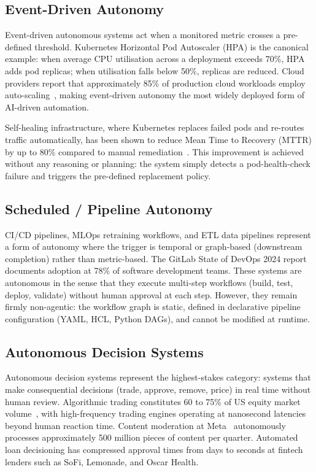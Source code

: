 \documentclass[12pt, a4paper]{article}
\begin{document}
\subsection{Event-Driven Autonomy}
Event-driven autonomous systems act when a monitored metric crosses a pre-defined threshold. Kubernetes Horizontal Pod Autoscaler (HPA) is the canonical example: when average CPU utilisation across a deployment exceeds 70\%, HPA adds pod replicas; when utilisation falls below 50\%, replicas are reduced. Cloud providers report that approximately 85\% of production cloud workloads employ auto-scaling~\citep{aws2024autoscaling}, making event-driven autonomy the most widely deployed form of AI-driven automation.

Self-healing infrastructure, where Kubernetes replaces failed pods and re-routes traffic automatically, has been shown to reduce Mean Time to Recovery (MTTR) by up to 80\% compared to manual remediation~\citep{netflix2024chaos}. This improvement is achieved without any reasoning or planning: the system simply detects a pod-health-check failure and triggers the pre-defined replacement policy.

\subsection{Scheduled / Pipeline Autonomy}
CI/CD pipelines, MLOps retraining workflows, and ETL data pipelines represent a form of autonomy where the trigger is temporal or graph-based (downstream completion) rather than metric-based. The GitLab State of DevOps 2024 report~\citep{gitlab2024devops} documents adoption at 78\% of software development teams. These systems are autonomous in the sense that they execute multi-step workflows (build, test, deploy, validate) without human approval at each step. However, they remain firmly non-agentic: the workflow graph is static, defined in declarative pipeline configuration (YAML, HCL, Python DAGs), and cannot be modified at runtime.

\subsection{Autonomous Decision Systems}
Autonomous decision systems represent the highest-stakes category: systems that make consequential decisions (trade, approve, remove, price) in real time without human review. Algorithmic trading constitutes 60 to 75\% of US equity market volume~\citep{tabb2024trading}, with high-frequency trading engines operating at nanosecond latencies beyond human reaction time. Content moderation at Meta~\citep{meta2024transparency} autonomously processes approximately 500 million pieces of content per quarter. Automated loan decisioning has compressed approval times from days to seconds at fintech lenders such as SoFi, Lemonade, and Oscar Health.
\end{document}
